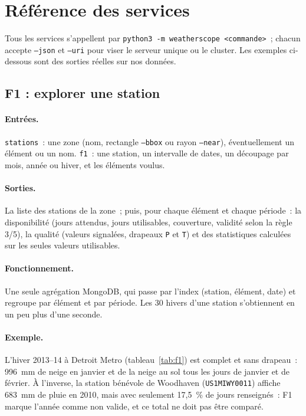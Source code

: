 \section{Référence des services}
\label{annexe:services}

Tous les services s'appellent par \texttt{python3 -m weatherscope <commande>}~; chacun accepte \texttt{--json} et \texttt{--uri} pour viser le serveur unique ou le cluster. Les exemples ci-dessous sont des sorties réelles sur nos données.

\subsection{F1 : explorer une station}
\paragraph{Entrées.} \texttt{stations}~: une zone (nom, rectangle \texttt{--bbox} ou rayon \texttt{--near}), éventuellement un élément ou un nom. \texttt{f1}~: une station, un intervalle de dates, un découpage par mois, année ou hiver, et les éléments voulus.
\paragraph{Sorties.} La liste des stations de la zone~; puis, pour chaque élément et chaque période~: la disponibilité (jours attendus, jours utilisables, couverture, validité selon la règle 3/5), la qualité (valeurs signalées, drapeaux \texttt{P} et \texttt{T}) et des statistiques calculées sur les seules valeurs utilisables.
\paragraph{Fonctionnement.} Une seule agrégation MongoDB, qui passe par l'index (station, élément, date) et regroupe par élément et par période. Les 30 hivers d'une station s'obtiennent en un peu plus d'une seconde.
\paragraph{Exemple.} L'hiver 2013--14 à Detroit Metro (tableau~\ref{tab:f1}) est complet et sans drapeau~: 996~mm de neige en janvier et de la neige au sol tous les jours de janvier et de février. À l'inverse, la station bénévole de Woodhaven (\texttt{US1MIWY0011}) affiche 683~mm de pluie en 2010, mais avec seulement 17,5~\% de jours renseignés~: F1 marque l'année comme non valide, et ce total ne doit pas être comparé.

